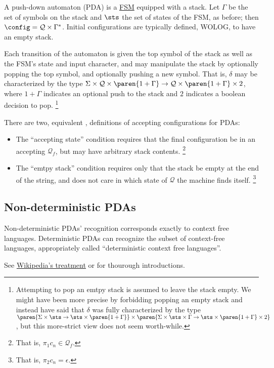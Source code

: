 A push-down automaton (PDA) is a \hyperref[sec:zoo-str/fsm]{FSM} equipped
with a stack.  Let $\Gamma$ be the set of symbols on the stack and $\sts$
the set of states of the FSM, as before; then $\config = \mathcal{Q} \times
\Gamma^*$.  Initial configurations are typically defined, WOLOG, to have an
empty stack.

Each transition of the automaton is given the top symbol of the
stack as well as the FSM's state and input character, and may manipulate the
stack by optionally popping the top symbol, and optionally pushing a new
symbol.  That is, $\delta$ may be characterized by the type $\Sigma
\times \mathcal{Q} \times \paren{1 + \Gamma} \to \mathcal{Q} \times
\paren{1 + \Gamma} \times 2$, where $1 + \Gamma$ indicates an optional push
to the stack and $2$ indicates a boolean decision to pop.%
%
\footnote{Attempting to pop an emtpy stack is assumed to leave the stack
empty.  We might have been more precise by forbidding popping an empty stack
and instead have said that $\delta$ was fully characterized by the type
$\paren{\Sigma \times \sts \to \sts \times \paren{1 + \Gamma}} \times
\paren{\Sigma \times \sts \times \Gamma \to \sts \times \paren{1 + \Gamma}
\times 2}$, but this more-strict view does not seem worth-while.}
%

There are two, equivalent \cite{xxx}, definitions of accepting
configurations for PDAs:
%
\begin{itemize}
%
    \item The ``accepting state'' condition requires that the final
    configuration be in an accepting $\mathcal{Q}_f$, but may have arbitrary stack
    contents.%
    \footnote{That is, $\pi_1 c_n \in \mathcal{Q}_f$.}
%
    \item The ``emtpy stack'' condition requires only that the stack be
    empty at the end of the string, and does not care in which state of
    $\mathcal{Q}$ the machine finds itself.
    \footnote{That is, $\pi_2 c_n = \epsilon$.}
%
\end{itemize}


\subsection{Non-deterministic PDAs}
\label{sec:zoo-str/pda-nd}

Non-deterministic PDAs' recognition corresponds exactly to context free languages.
Deterministic PDAs can recognize the subset of context-free languages,
appropriately called ``deterministic context free languages''.

See \href{http://wikipedia.org/Push-down\_automaton}{Wikipedia's treatment}
or \cite[Ch. 2]{sipser:theorycomp} for thourough introductions.


